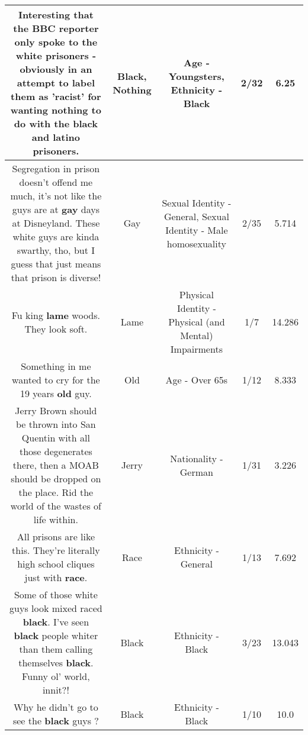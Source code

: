 \documentclass[11pt]{article}
\newlength\mylength
\begin{document}
\begin{center}
\begin{longtable}{|C{.65\mylength}|C{.30\mylength}|C{.12\mylength}|C{.12\mylength}|C{.12\mylength}|}
  \small Interesting that the BBC reporter only spoke to the white prisoners - obviously in an attempt to label them as 'racist' for wanting \textbf{nothing} to do with the \textbf{black} and latino prisoners.\normalsize   & Black, Nothing & Age - Youngsters, Ethnicity - Black & 2/32 & 6.25 \\  \hline
  \small Segregation in prison doesn't offend me much, it's not like the guys are at \textbf{g\textbf{ay}} days at Disneyland. These white guys are kinda swarthy, tho, but I guess that just means that prison is diverse!\normalsize   & Gay & Sexual Identity - General, Sexual Identity - Male homosexuality & 2/35 & 5.714 \\  \hline
  \small Fu king \textbf{lame} woods. They look soft.\normalsize   & Lame & Physical Identity - Physical (and Mental) Impairments & 1/7 & 14.286 \\  \hline
  \small Something in me wanted to cry for the 19 years \textbf{old} guy.\normalsize   & Old & Age - Over 65s & 1/12 & 8.333 \\  \hline
  \small Jerry Brown should be thrown into San Quentin with all those degenerates there, then a MOAB should be dropped on the place.  Rid the world of the wastes of life within.\normalsize   & Jerry & Nationality - German & 1/31 & 3.226 \\  \hline
  \small All prisons are like this. They're literally high school cliques just with \textbf{race}.\normalsize   & Race & Ethnicity - General & 1/13 & 7.692 \\  \hline
  \small Some of those white guys look mixed raced \textbf{black}. I've seen \textbf{black} people whiter than them calling themselves \textbf{black}. Funny ol' world, innit?!\normalsize   & Black & Ethnicity - Black & 3/23 & 13.043 \\  \hline
  \small Why he didn't go to see the \textbf{black} guys ?\normalsize   & Black & Ethnicity - Black & 1/10 & 10.0 \\  \hline

\end{longtable}
\end{center}
\end{document}
